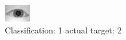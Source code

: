 \begin{figure}[h!]
\begin{center}
\includegraphics[width=0.60\columnwidth]{figures/ID913_class_1_target_2.png}
\end{center}
\caption{ Classification: 1 actual target: 2}
\label{fig:ID913_class_1_target_2}
\end{figure}
